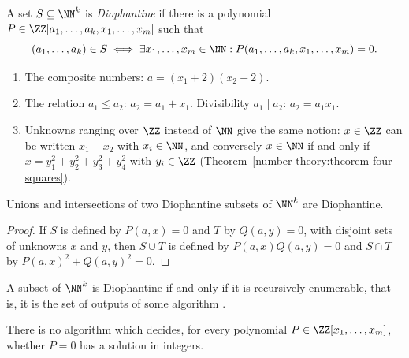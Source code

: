 \begin{definition}\label{diophantine-equations:definition-diophantine-set}
A set $S \subseteq \NN^k$ is \emph{Diophantine} if there is a polynomial $P \in \ZZ[a_1, \dots, a_k, x_1, \dots, x_m]$ such that
\[
(a_1, \dots, a_k) \in S \iff \exists x_1, \dots, x_m \in \NN : P(a_1, \dots, a_k, x_1, \dots, x_m) = 0.
\]
\end{definition}

\begin{example}\label{diophantine-equations:example-diophantine-sets}
\begin{enumerate}
\item The composite numbers: $a = (x_1 + 2)(x_2 + 2)$.
\item The relation $a_1 \leq a_2$: $a_2 = a_1 + x_1$. Divisibility $a_1 \mid a_2$: $a_2 = a_1x_1$.
\item Unknowns ranging over $\ZZ$ instead of $\NN$ give the same notion: $x \in \ZZ$ can be written $x_1 - x_2$ with $x_i \in \NN$, and conversely $x \in \NN$ if and only if $x = y_1^2 + y_2^2 + y_3^2 + y_4^2$
with $y_i \in \ZZ$ (Theorem~\ref{number-theory:theorem-four-squares}).
\end{enumerate}
\end{example}

\begin{proposition}\label{diophantine-equations:proposition-diophantine-closure}
Unions and intersections of two Diophantine subsets of $\NN^k$ are Diophantine.
\end{proposition}

\begin{proof}
If $S$ is defined by $P(a, x) = 0$ and $T$ by $Q(a, y) = 0$, with disjoint sets of unknowns $x$ and $y$, then $S \cup T$ is defined by $P(a, x)Q(a, y) = 0$ and $S \cap T$ by $P(a, x)^2 + Q(a, y)^2 = 0$.
\end{proof}

\begin{theorem}\label{diophantine-equations:theorem-mrdp}
A subset of $\NN^k$ is Diophantine if and only if it is recursively enumerable, that is, it is the set of outputs of some algorithm \cite{matiyasevich-hilbert}.
\end{theorem}

\begin{corollary}\label{diophantine-equations:corollary-hilbert-tenth}
There is no algorithm which decides, for every polynomial $P \in \ZZ[x_1, \dots, x_m]$, whether $P = 0$ has a solution in integers.
\end{corollary}

